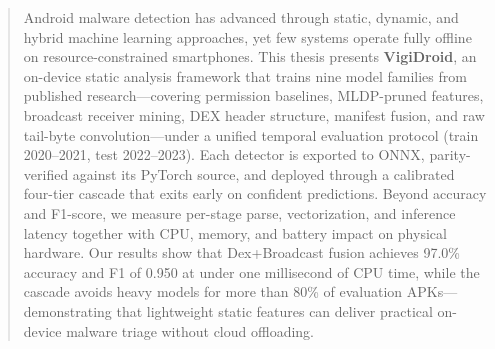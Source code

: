 \renewcommand{\abstractname}{\textbf{{\Large ABSTRACT}}}

\begin{abstract}\thispagestyle{plain}
Android malware detection has advanced through static, dynamic, and hybrid machine learning approaches, yet few systems operate fully offline on resource-constrained smartphones. This thesis presents \textbf{VigiDroid}, an on-device static analysis framework that trains nine model families from published research---covering permission baselines, MLDP-pruned features, broadcast receiver mining, DEX header structure, manifest fusion, and raw tail-byte convolution---under a unified temporal evaluation protocol (train 2020--2021, test 2022--2023). Each detector is exported to ONNX, parity-verified against its PyTorch source, and deployed through a calibrated four-tier cascade that exits early on confident predictions. Beyond accuracy and F1-score, we measure per-stage parse, vectorization, and inference latency together with CPU, memory, and battery impact on physical hardware. Our results show that Dex+Broadcast fusion achieves 97.0\% accuracy and F1 of 0.950 at under one millisecond of CPU time, while the cascade avoids heavy models for more than 80\% of evaluation APKs---demonstrating that lightweight static features can deliver practical on-device malware triage without cloud offloading. 
\end{abstract}

\endinput
